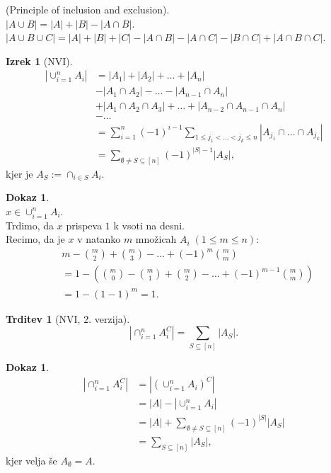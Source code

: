 \documentclass[a4paper, 12pt]{book}
\theoremstyle{definition}
\newtheorem{claim}[counter]{Trditev}
\newtheorem{theorem}[counter]{Izrek}
\newtheorem{pro}[counter]{Dokaz}
\theoremstyle{remark}
\begin{document}
(Principle of inclusion and exclusion). \\
$|A \cup B| = |A| + |B| - |A \cap B|$. \\
$|A \cup B \cup C| = |A| + |B| + |C| - |A \cap B| - |A \cap C| - |B \cap C| + |A \cap B \cap C|$.
\begin{theorem}[NVI]
  \begin{align*}
    |\cup_{i=1}^n A_i| &= |A_1| + |A_2| + \dots + |A_n| \\
    &- |A_1 \cap A_2| - \dots - |A_{n-1} \cap A_n| \\
    &+ |A_1 \cap A_2 \cap A_3| + \dots + |A_{n-2} \cap A_{n-1} \cap A_n| \\
    &- \dots \\
    &= \sum_{i=1}^{n} (-1)^{i-1} \sum_{1 \leq j_1 < \dots < j_k \leq n} |A_{j_1} \cap \dots \cap A_{j_k}| \\
    &= \sum_{\emptyset \neq S \subseteq [n]} (-1)^{|S|-1} |A_S|,
  \end{align*}
  kjer je $A_S := \cap_{i \in S} A_i$.
\end{theorem}
\begin{pro} \text{} \\
  $x \in \cup_{i=1}^n A_i$. \\
  Trdimo, da $x$ prispeva $1$ k vsoti na desni. \\
  Recimo, da je $x$ v natanko $m$ množicah $A_i \; (1 \leq m \leq n)$:
  \begin{align*}
    &m - \binom{m}{2} + \binom{m}{3} - \dots + (-1)^{m} \binom{m}{m} \\
    &= 1 - \left(\binom{m}{0} - \binom{m}{1} + \binom{m}{2} - \dots + (-1)^{m-1} \binom{m}{m}\right) \\
    &= 1 - (1-1)^m = 1.
  \end{align*}
\end{pro}
\begin{claim}[NVI, 2. verzija]
  \begin{equation*}
    \left|\cap_{i=1}^n A_i^C\right| = \sum_{S \subseteq [n]} |A_S|.
  \end{equation*}
\end{claim}
\begin{pro}
  \begin{align*}
    \left|\cap_{i=1}^n A_i^C\right| &= \left|(\cup_{i=1}^n A_i)^C\right| \\
    &= |A| - |\cup_{i=1}^n A_i| \\
    &= |A| + \sum_{\emptyset \neq S \subseteq [n]} (-1)^{|S|} |A_S| \\
    &= \sum_{S \subseteq [n]} |A_S|,
  \end{align*}
  kjer velja še $A_{\emptyset} = A$.
\end{pro}
\end{document}
